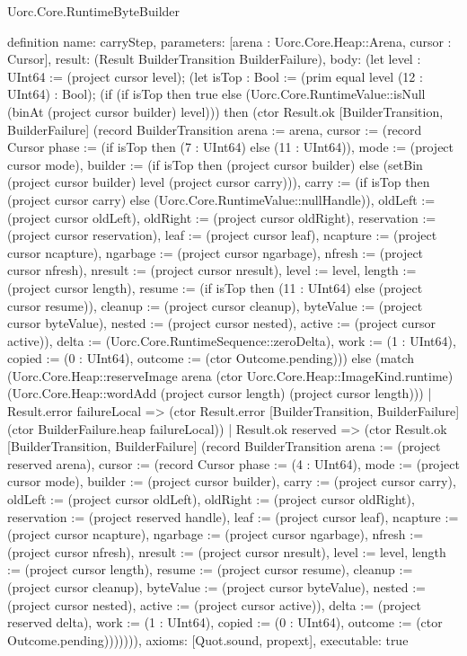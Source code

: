 \begin{lexlean}{Uorc.Core.RuntimeByteBuilder}
\begin{semanticmodule}
definition{
  name: carryStep,
  parameters: [arena : Uorc.Core.Heap::Arena, cursor : Cursor],
  result: (Result BuilderTransition BuilderFailure),
  body: (let level : UInt64 := (project cursor level); (let isTop : Bool := (prim equal level (12 : UInt64) : Bool); (if (if isTop then true else (Uorc.Core.RuntimeValue::isNull (binAt (project cursor builder) level))) then (ctor Result.ok [BuilderTransition, BuilderFailure] (record BuilderTransition {arena := arena, cursor := (record Cursor {phase := (if isTop then (7 : UInt64) else (11 : UInt64)), mode := (project cursor mode), builder := (if isTop then (project cursor builder) else (setBin (project cursor builder) level (project cursor carry))), carry := (if isTop then (project cursor carry) else (Uorc.Core.RuntimeValue::nullHandle)), oldLeft := (project cursor oldLeft), oldRight := (project cursor oldRight), reservation := (project cursor reservation), leaf := (project cursor leaf), ncapture := (project cursor ncapture), ngarbage := (project cursor ngarbage), nfresh := (project cursor nfresh), nresult := (project cursor nresult), level := level, length := (project cursor length), resume := (if isTop then (11 : UInt64) else (project cursor resume)), cleanup := (project cursor cleanup), byteValue := (project cursor byteValue), nested := (project cursor nested), active := (project cursor active)}), delta := (Uorc.Core.RuntimeSequence::zeroDelta), work := (1 : UInt64), copied := (0 : UInt64), outcome := (ctor Outcome.pending)})) else (match (Uorc.Core.Heap::reserveImage arena (ctor Uorc.Core.Heap::ImageKind.runtime) (Uorc.Core.Heap::wordAdd (project cursor length) (project cursor length)))
    | Result.error failureLocal => (ctor Result.error [BuilderTransition, BuilderFailure] (ctor BuilderFailure.heap failureLocal))
    | Result.ok reserved => (ctor Result.ok [BuilderTransition, BuilderFailure] (record BuilderTransition {arena := (project reserved arena), cursor := (record Cursor {phase := (4 : UInt64), mode := (project cursor mode), builder := (project cursor builder), carry := (project cursor carry), oldLeft := (project cursor oldLeft), oldRight := (project cursor oldRight), reservation := (project reserved handle), leaf := (project cursor leaf), ncapture := (project cursor ncapture), ngarbage := (project cursor ngarbage), nfresh := (project cursor nfresh), nresult := (project cursor nresult), level := level, length := (project cursor length), resume := (project cursor resume), cleanup := (project cursor cleanup), byteValue := (project cursor byteValue), nested := (project cursor nested), active := (project cursor active)}), delta := (project reserved delta), work := (1 : UInt64), copied := (0 : UInt64), outcome := (ctor Outcome.pending)})))))),
  axioms: [Quot.sound, propext],
  executable: true
}


\end{semanticmodule}
\end{lexlean}
